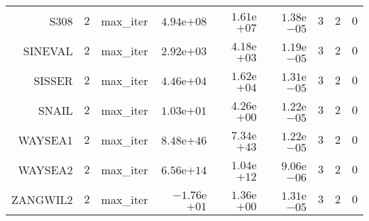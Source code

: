 \begin{longtable}{rrrrrrrrr}
S308 & \(     2\) & max\_iter & \( 4.94\)e\(+08\) & \( 1.61\)e\(+07\) & \( 1.38\)e\(-05\) & \(     3\) & \(     2\) & \(     0\) \\
SINEVAL & \(     2\) & max\_iter & \( 2.92\)e\(+03\) & \( 4.18\)e\(+03\) & \( 1.19\)e\(-05\) & \(     3\) & \(     2\) & \(     0\) \\
SISSER & \(     2\) & max\_iter & \( 4.46\)e\(+04\) & \( 1.62\)e\(+04\) & \( 1.31\)e\(-05\) & \(     3\) & \(     2\) & \(     0\) \\
SNAIL & \(     2\) & max\_iter & \( 1.03\)e\(+01\) & \( 4.26\)e\(+00\) & \( 1.22\)e\(-05\) & \(     3\) & \(     2\) & \(     0\) \\
WAYSEA1 & \(     2\) & max\_iter & \( 8.48\)e\(+46\) & \( 7.34\)e\(+43\) & \( 1.22\)e\(-05\) & \(     3\) & \(     2\) & \(     0\) \\
WAYSEA2 & \(     2\) & max\_iter & \( 6.56\)e\(+14\) & \( 1.04\)e\(+12\) & \( 9.06\)e\(-06\) & \(     3\) & \(     2\) & \(     0\) \\
ZANGWIL2 & \(     2\) & max\_iter & \(-1.76\)e\(+01\) & \( 1.36\)e\(+00\) & \( 1.31\)e\(-05\) & \(     3\) & \(     2\) & \(     0\) \\\hline
\end{longtable}
